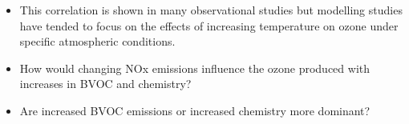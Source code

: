 \begin{BlueBox}
    \vskip-1cm
    \begin{block}{}
        \begin{itemize}
            \item This correlation is shown in many observational studies but modelling studies have tended to focus on the effects of increasing temperature on ozone under specific atmospheric conditions.
            \item How would changing NOx emissions influence the ozone produced with increases in BVOC and chemistry?
            \item Are increased BVOC emissions or increased chemistry more dominant?
        \end{itemize}
    \end{block}
\end{BlueBox}
